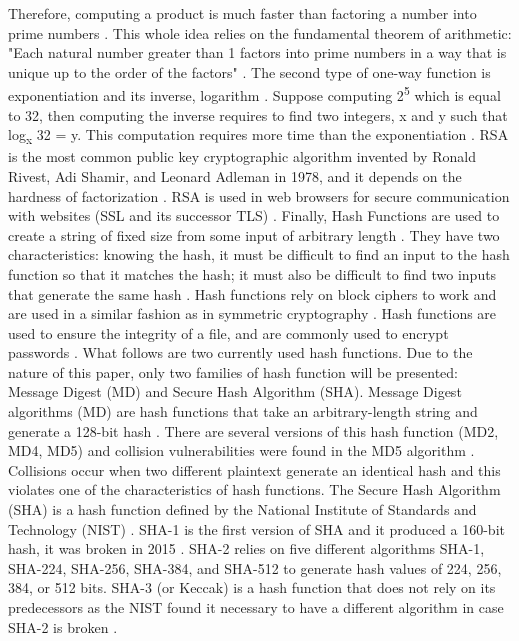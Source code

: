 \documentclass{l4proj}
\begin{document}
Therefore, computing a product is much faster than factoring a number into prime numbers \citep{kessler_overview_2016}. 
This whole idea relies on the fundamental theorem of arithmetic: 
"Each natural number greater than 1 factors into prime numbers in a way that is unique up to the order of the factors" \citep{anderson_security_2008}.
The second type of one-way function is exponentiation and its inverse, logarithm \citep{kessler_overview_2016}. Suppose computing 2\textsuperscript{5} which is equal
to 32, then computing the inverse requires to find two integers, x and y such that log\textsubscript{x} 32 = y. This computation requires more time than the exponentiation \citep{kessler_overview_2016}.
RSA is the most common public key cryptographic algorithm invented by Ronald Rivest, Adi Shamir, and Leonard Adleman in 1978, 
and it depends on the hardness of factorization \citep{kessler_overview_2016} \citep{savage_cse_2019}.
RSA is used in web browsers for secure communication with websites (SSL and its successor TLS) \citep{anderson_security_2008}.
Finally, Hash Functions are used to create a string of fixed size from some input of arbitrary length \citep{savage_cse_2019}. 
They have two characteristics: knowing the hash, it must be difficult to find an input to the hash function so that it matches the hash;
it must also be difficult to find two inputs that generate the same hash \citep{savage_cse_2019}. 
Hash functions rely on block ciphers to work and are used in a similar fashion as in symmetric cryptography \citep{anderson_security_2008}. 
Hash functions are used to ensure the integrity of a file, and are commonly used to encrypt passwords \citep{kessler_overview_2016}. What follows are two currently used hash functions. 
Due to the nature of this paper, only two families of hash function will be presented: Message Digest (MD) and Secure Hash Algorithm (SHA).
Message Digest algorithms (MD) are hash functions that take an arbitrary-length string and generate a 128-bit hash \citep{kessler_overview_2016}.
There are several versions of this hash function (MD2, MD4, MD5) and collision vulnerabilities were found in the MD5 algorithm \citep{kessler_overview_2016}.
Collisions occur when two different plaintext generate an identical hash and this violates one of the characteristics of hash functions.
The Secure Hash Algorithm (SHA) is a hash function defined by the National Institute of Standards and Technology (NIST) \citep{kessler_overview_2016}. 
SHA-1 is the first version of SHA and it produced a 160-bit hash, it was broken in 2015 \citep{kessler_overview_2016}. SHA-2 relies on five different algorithms
SHA-1, SHA-224, SHA-256, SHA-384, and SHA-512 to generate hash values of 224, 256, 384, or 512 bits. 
SHA-3 (or Keccak) is a hash function that does not rely on its predecessors as the NIST found it necessary to have a different algorithm in case SHA-2 is broken \citep{kessler_overview_2016}.
\end{document}
